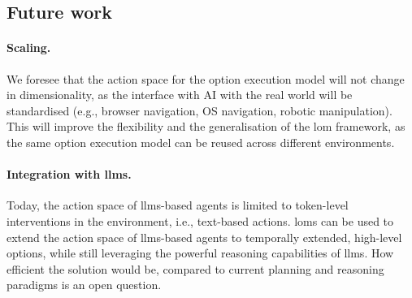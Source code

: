 \documentclass{article}
\theoremstyle{postulate}
\begin{document}
\subsection{Future work}
\paragraph{Scaling.}
We foresee that the action space for the option execution model will not change in dimensionality, as the interface with AI with the real world will be standardised (e.g., browser navigation, OS navigation, robotic manipulation).
This will improve the flexibility and the generalisation of the \gls{lom} framework, as the same option execution model can be reused across different environments.

\paragraph{Integration with \glspl{llm}.}
Today, the action space of \glspl{llm}-based agents is limited to token-level interventions in the environment, i.e., text-based actions.
\glspl{lom} can be used to extend the action space of \glspl{llm}-based agents to temporally extended, high-level options, while still leveraging the powerful reasoning capabilities of \glspl{llm}.
How efficient the solution would be, compared to current planning and reasoning paradigms is an open question.







\newpage

\newpage
% 
\end{document}
